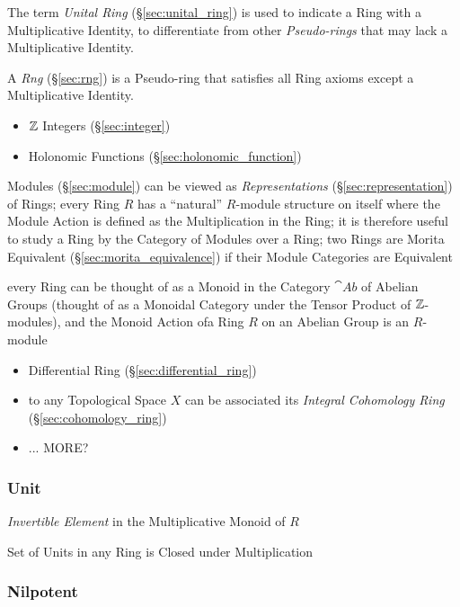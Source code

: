 The term \emph{Unital Ring} (\S\ref{sec:unital_ring}) is used to
indicate a Ring with a Multiplicative Identity, to differentiate from
other \emph{Pseudo-rings} that may lack a Multiplicative Identity.

A \emph{Rng} (\S\ref{sec:rng}) is a Pseudo-ring that satisfies all
Ring axioms except a Multiplicative Identity.

\begin{itemize}
  \item $\mathbb{Z}$ Integers (\S\ref{sec:integer})
  \item Holonomic Functions (\S\ref{sec:holonomic_function})
\end{itemize}

\fist Modules (\S\ref{sec:module}) can be viewed as \emph{Representations}
(\S\ref{sec:representation}) of Rings; every Ring $R$ has a ``natural''
$R$-module structure on itself where the Module Action is defined as the
Multiplication in the Ring; it is therefore useful to study a Ring by the
Category of Modules over a Ring; two Rings are Morita Equivalent
(\S\ref{sec:morita_equivalence}) if their Module Categories are Equivalent

every Ring can be thought of as a Monoid in the Category $\cat{Ab}$ of Abelian
Groups (thought of as a Monoidal Category under the Tensor Product of
$\mathbb{Z}$-modules), and the Monoid Action ofa Ring $R$ on an Abelian Group is an
$R$-module

\begin{itemize}
  \item Differential Ring (\S\ref{sec:differential_ring})
  \item to any Topological Space $X$ can be associated its \emph{Integral
    Cohomology Ring} (\S\ref{sec:cohomology_ring})
  \item ... MORE?
\end{itemize}



\subsubsection{Unit}\label{sec:ring_unit}

\emph{Invertible Element} in the Multiplicative Monoid of $R$

Set of Units in any Ring is Closed under Multiplication



\subsubsection{Nilpotent}\label{sec:nilpotent}


